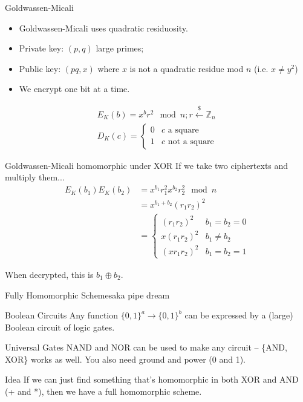 \documentclass[12pt]{beamer}
\begin{document}
\begin{frame}{Goldwassen-Micali}
	\begin{itemize}
	\item Goldwassen-Micali uses quadratic residuosity.

	\item Private key: $(p, q)$ large primes;
	\item Public key: $(pq, x)$ where $x$ is not a quadratic residue mod $n$
		(i.e. $x \neq y^2$)

	\item We encrypt one bit at a time.
	\end{itemize}

	\begin{align*}
		E_K(b) = x^b r^2 \mod n; r \xleftarrow{\$} \mathbb{Z}_n \\
		D_K(c) = \begin{cases} 0 & c \text{ a square} \\ 1 & c \text{ not a
			square} \end{cases}
	\end{align*}
\end{frame}

\begin{frame}{Goldwassen-Micali homomorphic under XOR}
	If we take two ciphertexts and multiply them...
	\begin{align*}
		E_K(b_1)E_K(b_2) &= x^{b_1}r_1^2 x^{b_2}r_2^2 \mod n \\
		&= x^{b_1 + b_2} (r_1r_2)^2 \\
		&= \begin{cases} (r_1r_2)^2 & b_1 = b_2 = 0 \\
			x (r_1r_2)^2 & b_1 \neq b_2 \\
			(xr_1r_2)^2 & b_1 = b_2 = 1 \end{cases}
	\end{align*}

	When decrypted, this is $b_1 \oplus b_2$.
\end{frame}

\begin{frame}{Fully Homomorphic Schemes}{aka pipe dream}
	\begin{block}{Boolean Circuits}
		Any function $\{0,1\}^a \rightarrow \{0,1\}^b$ can be expressed by a (large)
		Boolean circuit of logic gates.
	\end{block}

	\begin{block}{Universal Gates}
		NAND and NOR can be used to make any circuit -- \{AND, XOR\} works as
		well. You also need ground and power (0 and 1).
	\end{block}

	\begin{block}{Idea}
		If we can just find something that's homomorphic in both XOR and AND (+
		and *), then we have a full homomorphic scheme.
	\end{block}
\end{frame}
\end{document}
